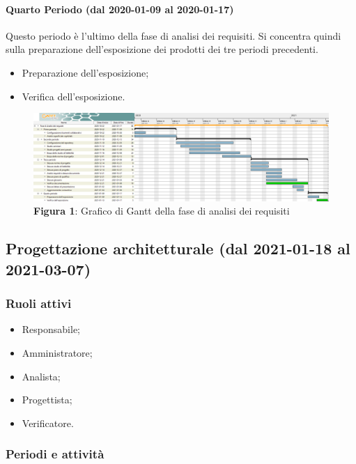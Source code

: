\paragraph{Quarto Periodo (dal 2020-01-09 al 2020-01-17)}
Questo periodo è l'ultimo della fase di analisi dei requisiti. Si concentra quindi sulla preparazione dell'esposizione dei prodotti dei tre periodi precedenti.
\begin{itemize}
	\item Preparazione dell'esposizione;
	\item Verifica dell'esposizione.
\end{itemize}


\begin{landscape}
	\begin{figure}[H]
		\centering
		\includegraphics[width=\linewidth]{res/images/ganttFase1.png}
		\caption*{\textbf{Figura 1}{: Grafico di Gantt della fase di analisi dei requisiti}}
		\label{fig:Gantt Analisi dei requisiti}
	\end{figure}
\end{landscape}

\subsection{Progettazione architetturale (dal 2021-01-18 al 2021-03-07)}

\subsubsection{Ruoli attivi}
\begin{itemize}
	\item Responsabile;
	\item Amministratore;
	\item Analista;
	\item Progettista;
	\item Verificatore.
\end{itemize}

\subsubsection{Periodi e attività}

